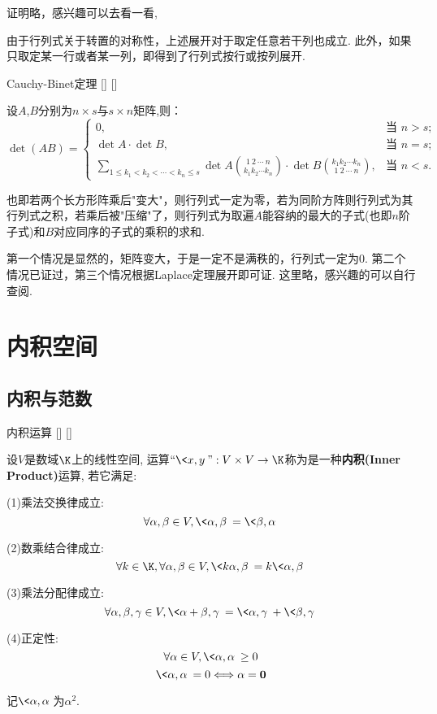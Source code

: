 \documentclass[UTF8]{ctexart}
\begin{document}
    \begin{prf}
        证明略，感兴趣可以去看一看, 
    \end{prf}
    由于行列式关于转置的对称性，上述展开对于取定任意若干列也成立. 此外，如果只取定某一行或者某一列，即得到了行列式按行或按列展开.
    \begin{thm}
			[]
			{Cauchy-Binet定理}
			[]
			[]

        设$A$,$B$分别为$n\times s$与$s\times n$矩阵,则：
        \[\det(AB)=\begin{cases}0,&\text{当 }n>s;\\
        \det A\cdot\det B,&\text{当 }n=s;\\
        \sum_{1\leqslant k_1<k_2<\cdots<k_n\leqslant s}\det A\binom{1\ 2\ \cdots \ n}{k_1k_2\cdots k_n}\cdot\det B\binom{k_1k_2\cdots k_n}{1\ 2\ \cdots \ n},&\text{当 }n<s.\end{cases}\]
    \end{thm}
    也即若两个长方形阵乘后"变大"，则行列式一定为零，若为同阶方阵则行列式为其行列式之积，若乘后被"压缩"了，则行列式为取遍$A$能容纳的最大的子式(也即$n$阶子式)和$B$对应同序的子式的乘积的求和.
    \begin{prf}
        第一个情况是显然的，矩阵变大，于是一定不是满秩的，行列式一定为0. 第二个情况已证过，第三个情况根据Laplace定理展开即可证. 这里略，感兴趣的可以自行查阅.
    \end{prf}

\section{内积空间}
	
	\subsection{内积与范数}
			
		\begin{dfn}
			[]
			{内积运算}
			[]
			[]

			设$V$是数域$\K$上的线性空间, 运算$``\<x,y\>":V\times V\to\K$称为是一种\textbf{内积(Inner Product)}运算, 若它满足: 
			
			(1)乘法交换律成立: 
			\[\forall\alpha,\beta\in V, \<\alpha,\beta\>=\<\beta,\alpha\>\]
			
			(2)数乘结合律成立: 
			\[\forall k\in\K, \forall \alpha,\beta\in V, \<k\alpha,\beta\>=k\<\alpha,\beta\>\]
			
			(3)乘法分配律成立: 
			\[\forall\alpha,\beta,\gamma\in V, \<\alpha+\beta,\gamma\>=\<\alpha,\gamma\>+\<\beta,\gamma\>\]
			
			(4)正定性: 
			\[\forall \alpha\in V, \<\alpha,\alpha\>\geq 0\]
			\[\<\alpha,\alpha\>=0\Longleftrightarrow \alpha=\mathbf{0}\]
			
			记$\<\alpha,\alpha\>$为$\alpha^2$. 
		\end{dfn}
		
\end{document}

